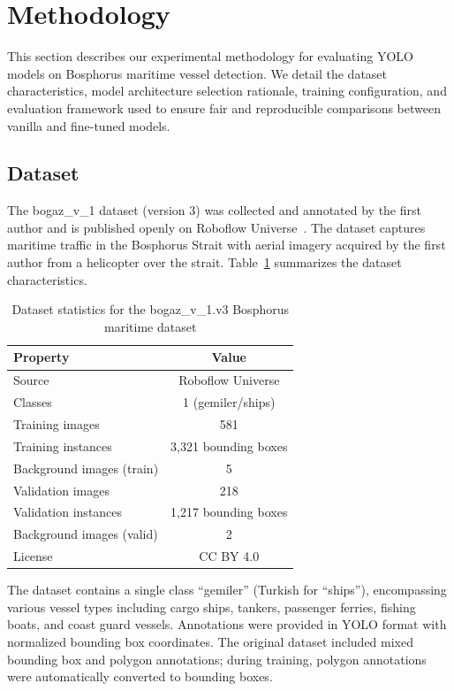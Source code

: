 \documentclass[pdflatex,sn-mathphys-num,Numbered]{sn-jnl}
\begin{document}
\section{Methodology}\label{sec:methodology}

This section describes our experimental methodology for evaluating YOLO models on Bosphorus maritime vessel detection. We detail the dataset characteristics, model architecture selection rationale, training configuration, and evaluation framework used to ensure fair and reproducible comparisons between vanilla and fine-tuned models.

\subsection{Dataset}\label{subsec:dataset}

The bogaz\_v\_1 dataset (version 3) was collected and annotated by the first author and is published openly on Roboflow Universe~\cite{roboflow2024bogaz}. The dataset captures maritime traffic in the Bosphorus Strait with aerial imagery acquired by the first author from a helicopter over the strait. Table~\ref{tab:dataset} summarizes the dataset characteristics.

\begin{table}[!ht]
\centering
\caption{Dataset statistics for the bogaz\_v\_1.v3 Bosphorus maritime dataset}\label{tab:dataset}
\begin{tabular}{lc}
\toprule
\textbf{Property} & \textbf{Value} \\
\midrule
Source & Roboflow Universe \\
Classes & 1 (gemiler/ships) \\
Training images & 581 \\
Training instances & 3,321 bounding boxes \\
Background images (train) & 5 \\
Validation images & 218 \\
Validation instances & 1,217 bounding boxes \\
Background images (valid) & 2 \\
License & CC BY 4.0 \\
\bottomrule
\end{tabular}
\end{table}

The dataset contains a single class ``gemiler'' (Turkish for ``ships''), encompassing various vessel types including cargo ships, tankers, passenger ferries, fishing boats, and coast guard vessels. Annotations were provided in YOLO format with normalized bounding box coordinates. The original dataset included mixed bounding box and polygon annotations; during training, polygon annotations were automatically converted to bounding boxes.
\end{document}
